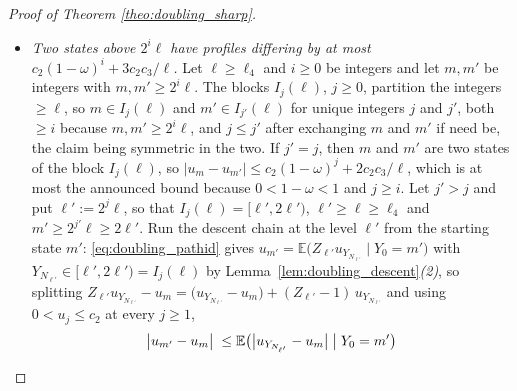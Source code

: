 \begin{proof}[Proof of Theorem \ref{theo:doubling_sharp}]
\begin{itemize}
    $\int u\,d\pi_{y'}$, both bearing on the restriction of $u$ to $[\ell,2\ell)$, where
    $Y_{N_\ell}$ lives by Lemma~\ref{lem:doubling_descent}\emph{(2)}. Two probabilities $\pi$,
    $\pi'$ on the integers and a bounded function $f$ satisfy
    $\bigl|\int f\,d(\pi-\pi')\bigr|\leq(\sup f-\inf f)\,\TV(\pi\|\pi')$: the signed measure
    $\pi-\pi'$ has total mass $0$, so
    $\int f\,d(\pi-\pi')=\int\bigl(f-\tfrac12(\sup f+\inf f)\bigr)\,d(\pi-\pi')$, the
    integrand of the right side has modulus at most $\tfrac12(\sup f-\inf f)$, and
    $\sum_j|\pi(j)-\pi'(j)|=2\,\TV(\pi\|\pi')$ in the $\tfrac12$-convention in force
    (Definition~\ref{def:doubling_setting}). Apply this at $f=u$ on $[\ell,2\ell)$, whose
    supremum minus infimum there is at most $c_2-c_1\leq c_2$, and at $\pi=\pi_y$,
    $\pi'=\pi_{y'}$, whose total variation is at most $(1-\omega)^{i}$ by
    \eqref{eq:doubling_coupling}, whose hypotheses
    $\ell\geq\ell_4$ and $y,y'\in I_i(\ell)$ hold: the two first terms differ by at most
    $c_2(1-\omega)^{i}$.
    \item \emph{Two states above $2^{i}\ell$ have profiles differing by at most
    $c_2(1-\omega)^{i}+3c_2c_3/\ell$.} Let $\ell\geq\ell_4$ and $i\geq0$ be integers and let
    $m,m'$ be integers with $m,m'\geq2^{i}\ell$. The blocks $I_j(\ell)$, $j\geq0$, partition
    the integers $\geq\ell$, so $m\in I_j(\ell)$ and $m'\in I_{j'}(\ell)$ for unique integers
    $j$ and $j'$, both $\geq i$ because $m,m'\geq2^{i}\ell$, and $j\leq j'$ after exchanging
    $m$ and $m'$ if need be, the claim being symmetric in the two. If $j'=j$, then $m$ and
    $m'$ are two states of the block $I_j(\ell)$, so
    $|u_m-u_{m'}|\leq c_2(1-\omega)^{j}+2c_2c_3/\ell$, which is at most the announced bound
    because $0<1-\omega<1$ and $j\geq i$. Let $j'>j$ and put $\ell':=2^{j}\ell$, so that
    $I_j(\ell)=[\ell',2\ell')$, $\ell'\geq\ell\geq\ell_4$ and $m'\geq2^{j'}\ell\geq2\ell'$.
    Run the descent chain at the level $\ell'$ from the starting state $m'$:
    \eqref{eq:doubling_pathid} gives
    $u_{m'}=\mathbb E\bigl(Z_{\ell'}u_{Y_{N_{\ell'}}}\mid Y_0=m'\bigr)$ with
    $Y_{N_{\ell'}}\in[\ell',2\ell')=I_j(\ell)$ by Lemma~\ref{lem:doubling_descent}\emph{(2)},
    so splitting $Z_{\ell'}u_{Y_{N_{\ell'}}}-u_m=\bigl(u_{Y_{N_{\ell'}}}-u_m\bigr)
    +(Z_{\ell'}-1)\,u_{Y_{N_{\ell'}}}$ and using $0<u_j\leq c_2$ at every $j\geq1$,
    \begin{equation}
    \begin{aligned}
        \bigl|u_{m'}-u_m\bigr|\;\leq\;&
        \mathbb E\bigl(\bigl|u_{Y_{N_{\ell'}}}-u_m\bigr|\bigm| Y_0=m'\bigr)\\

\end{aligned}
\end{equation}
\end{itemize}
\end{proof}
